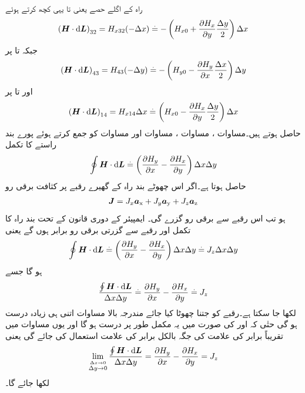 راہ کے اگلے حصے یعنی  تا  یہی کچھ کرتے ہوئے
\begin{align}\label{مساوات_مقناطیسی_پہلے_حصہ_تکمل_ب}
\left( \kvec{H} \cdot \dif \kvec{L}\right)_{32}=H_{x32}(-\Delta x) \overset{.}{=}-\left(H_{x0}+\frac{\partial H_x}{\partial y} \frac{\Delta y}{2} \right)\Delta x 
\end{align}
جبکہ  تا  پر
\begin{align}\label{مساوات_مقناطیسی_پہلے_حصہ_تکمل_پ}
\left( \kvec{H} \cdot \dif \kvec{L}\right)_{43}=H_{43}(-\Delta y)\overset{.}{=}-\left(H_{y0}-\frac{\partial H_y}{\partial x} \frac{\Delta x}{2} \right)\Delta y 
\end{align}
اور  تا  پر
\begin{align}\label{مساوات_مقناطیسی_پہلے_حصہ_تکمل_ت}
\left( \kvec{H} \cdot \dif \kvec{L}\right)_{14}=H_{x14}\Delta x \overset{.}{=}\left(H_{x0}-\frac{\partial H_x}{\partial y} \frac{\Delta y}{2} \right)\Delta x 
\end{align}
حاصل ہوتے ہیں۔مساوات  ، مساوات ، مساوات  اور مساوات  کو جمع کرتے ہوئے پورے بند راستے کا تکمل
\begin{align}
\oint \kvec{H} \cdot \dif \kvec{L}\overset{.}{=}\left(\frac{\partial H_y}{\partial x}-\frac{\partial H_x}{\partial y} \right)\Delta x \Delta y
\end{align}
حاصل ہوتا ہے۔اگر اس چھوٹے بند راہ کے گھیرے رقبے پر کثافت برقی رو
\begin{align*}
{\ensuremath{{\boldsymbol{J}}}}=J_x {\boldsymbol{a}}_{\textup{x}}+J_y{\boldsymbol{a}}_{\textup{y}}+J_z {\boldsymbol{a}}_{\textup{z}}
\end{align*}
ہو تب اس رقبے سے  برقی رو گزرے گی۔ ایمپیئر کے دوری قانون کے تحت بند راہ کا تکمل اور رقبے سے گزرتی برقی رو برابر ہوں گے یعنی
\begin{align*}
\oint \kvec{H} \cdot \dif \kvec{L}\overset{.}{=}\left(\frac{\partial H_y}{\partial x}-\frac{\partial H_x}{\partial y} \right)\Delta x \Delta y\overset{.}{=}J_z \Delta x \Delta y
\end{align*}
ہو گا جسے
\begin{align*}
\frac{\oint \kvec{H} \cdot \dif \kvec{L}}{\Delta x \Delta y}\overset{.}{=}\frac{\partial H_y}{\partial x}-\frac{\partial H_x}{\partial y}\overset{.}{=}J_z
\end{align*}
لکھا جا سکتا ہے۔رقبے کو جتنا چھوٹا کیا جائے مندرجہ بالا مساوات اتنی ہی زیادہ درست ہو گی حتٰی کہ  اور  کی صورت میں یہ مکمل طور پر درست ہو گا اور یوں مساوات میں تقریباً برابر کی علامت  کی جگہ بالکل برابر  کی علامت استعمال کی جائے گی یعنی
\begin{align}\label{مساوات_مقناطیسی_گردش_الف}
\lim_{\overset{\Delta x \to 0}{\Delta y \to 0}}\frac{\oint \kvec{H} \cdot \dif \kvec{L}}{\Delta x \Delta y}=\frac{\partial H_y}{\partial x}-\frac{\partial H_x}{\partial y}=J_z
\end{align}
لکھا جائے گا۔

